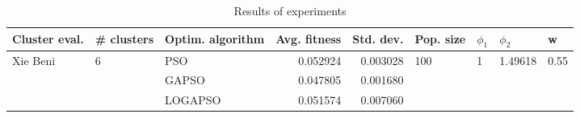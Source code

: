 \begin{table}
\centering
\caption{Results of experiments}
\begin{tabular}{lllrrllll}
\toprule
            Cluster eval. &        \# clusters & Optim. algorithm &  Avg. fitness &  Std. dev. &            Pop. size &         $\phi_{1}$ &               $\phi_{2}$ &                     w \\
\midrule
\multirow{3}{*}{Xie Beni} & \multirow{3}{*}{6} &              PSO &      0.052924 &   0.003028 & \multirow{3}{*}{100} & \multirow{3}{*}{1} & \multirow{3}{*}{1.49618} & \multirow{3}{*}{0.55} \\
                          &                    &            GAPSO &      0.047805 &   0.001680 &                      &                    &                          &                       \\
                          &                    &          LOGAPSO &      0.051574 &   0.007060 &                      &                    &                          &                       \\
\bottomrule
\end{tabular}
\end{table}

